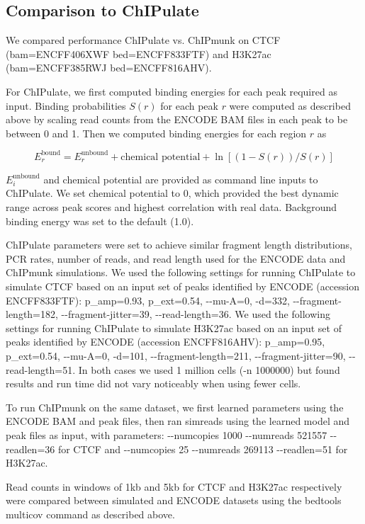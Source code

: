 \documentclass[12pt]{article}
\begin{document}
\subsection*{Comparison to ChIPulate}

We compared performance ChIPulate vs. ChIPmunk on CTCF (bam=ENCFF406XWF bed=ENCFF833FTF) and H3K27ac (bam=ENCFF385RWJ bed=ENCFF816AHV).

For ChIPulate, we first computed binding energies for each peak required as input. Binding probabilities $S(r)$ for each peak $r$ were computed as described above by scaling read counts from the ENCODE BAM files in each peak to be between 0 and 1. Then we computed binding energies for each region $r$ as

$$E^{\text{bound}}_r= E^{\text{unbound}}_r + \text{chemical potential} + \ln\left[(1-S(r))/S(r)\right]$$

$E^{\text{unbound}}_i$ and chemical potential are provided as command line inputs to ChIPulate. We set chemical potential to 0, which provided the best dynamic range across peak scores and highest correlation with real data. Background binding energy was set to the default (1.0).

ChIPulate parameters were set to achieve similar fragment length distributions, PCR rates, number of reads, and read length used for the ENCODE data and ChIPmunk simulations. We used the following settings for running ChIPulate to simulate CTCF based on an input set of peaks identified by ENCODE (accession ENCFF833FTF): p\_amp=0.93, p\_ext=0.54, -{}-mu-A=0, -d=332, -{}-fragment-length=182, -{}-fragment-jitter=39, -{}-read-length=36. We used the following settings for running ChIPulate to simulate H3K27ac based on an input set of peaks identified by ENCODE (accession ENCFF816AHV): p\_amp=0.95, p\_ext=0.54, -{}-mu-A=0, -d=101, -{}-fragment-length=211, -{}-fragment-jitter=90, -{}-read-length=51.
In both cases we used 1 million cells (-n 1000000) but found results and run time did not vary noticeably when using fewer cells.

To run ChIPmunk on the same dataset, we first learned parameters using the ENCODE BAM and peak files, then ran simreads using the learned model and peak files as input, with parameters: -{}-numcopies 1000 -{}-numreads 521557 -{}-readlen=36 for CTCF and -{}-numcopies 25 -{}-numreads 269113 -{}-readlen=51 for H3K27ac.

Read counts in windows of 1kb and 5kb for CTCF and H3K27ac respectively were compared between simulated and ENCODE datasets using the bedtools multicov command as described above.
\end{document}
